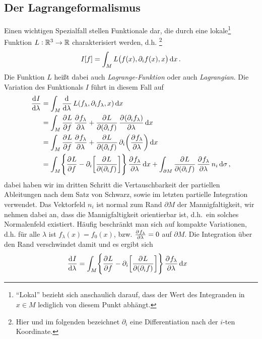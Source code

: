 \subsection{Der Lagrangeformalismus}
Einen wichtigen Spezialfall stellen Funktionale dar, die durch eine
lokale\footnote{"`Lokal"' bezieht sich anschaulich darauf, dass der Wert des
Integranden in $x\in M$ lediglich von diesem Punkt abhängt.} Funktion
${L:\mathbb{R}^3\to \mathbb{R}}$ charakterisiert werden, d.h. \footnote{Hier
und im folgenden bezeichnet $\partial_i$ eine Differentiation nach der $i$-ten
Koordinate.}
\begin{equation}
I[f]=\int_M L\left(f(x),\partial_i f(x),x\right)\dif x\,.
\end{equation}
Die Funktion $L$ heißt dabei auch \emph{Lagrange-Funktion} oder auch
\emph{Lagrangian}.
Die Variation des Funktionals $I$ führt in diesem Fall auf
\begin{equation}
\begin{split}
\dod{I}{\lambda}
&=\int_M\dod{}{\lambda}L(f_\lambda,\partial_i
f_\lambda,x)\dif x\\
&=\int_M\dpd{L}{ f}\dpd{ f_\lambda}{\lambda}
+\dpd{L}{(\partial_i f)}\dpd{(\partial_i f_\lambda)}{\lambda}\dif x\\
&=\int_M\dpd{L}{ f}\dpd{ f_\lambda}{\lambda}
+\dpd{L}{(\partial_i f)}\partial_i\left(\dpd{
f_\lambda}{\lambda}\right)\dif x\\
&=\int_M\left\{\dpd{L}{ f}
-\partial_i\left[\dpd{L}{(\partial_i f)}\right]\right\}\dpd{
f_\lambda}{\lambda}\dif x +\int_{\partial
M}\dpd{L}{(\partial_i f)}\dpd{
f_\lambda}{\lambda}n_i\dif\sigma\,,
\end{split}
\end{equation}
dabei haben wir im dritten Schritt die Vertauschbarkeit
der partiellen Ableitungen nach dem Satz von Schwarz, sowie im letzten
partielle Integration verwendet. Das Vektorfeld $n_i$ ist normal zum Rand
$\partial M$ der Mannigfaltigkeit, wir nehmen dabei an, dass die
Mannigfaltigkeit orientierbar ist, d.h.\ ein solches Normalenfeld existiert.
Häufig beschränkt man sich auf kompakte Variationen, d.h. für alle $\lambda$ ist
$f_\lambda(x)=f_0(x)$, bzw. $\pd{ f_\lambda}{\lambda}=0$ auf $\partial M$. Die
Integration über den Rand verschwindet damit und es ergibt sich
\begin{equation}
\begin{split}
\dod{I}{\lambda}
&=\int_M\left\{\dpd{L}{ f}
-\partial_i\left[\dpd{L}{(\partial_i f)}\right]\right\}\dpd{
f_\lambda}{\lambda}\dif x
\end{split}
\end{equation}
